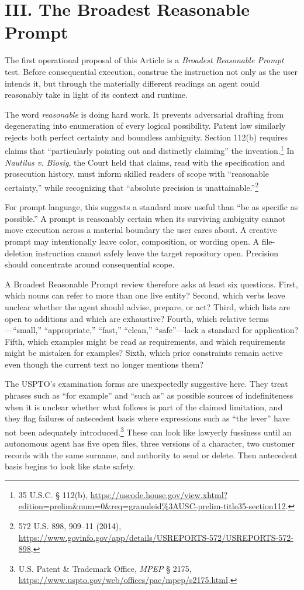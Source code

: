 \documentclass[11pt]{article}
\begin{document}
\section*{III. The Broadest Reasonable Prompt}
The first operational proposal of this Article is a \emph{Broadest Reasonable Prompt} test. Before consequential execution, construe the instruction not only as the user intends it, but through the materially different readings an agent could reasonably take in light of its context and runtime.

The word \emph{reasonable} is doing hard work. It prevents adversarial drafting from degenerating into enumeration of every logical possibility. Patent law similarly rejects both perfect certainty and boundless ambiguity. Section 112(b) requires claims that ``particularly pointing out and distinctly claiming'' the invention.\footnote{35 U.S.C. § 112(b), \url{https://uscode.house.gov/view.xhtml?edition=prelim\&num=0\&req=granuleid\%3AUSC-prelim-title35-section112}.} In \emph{Nautilus v. Biosig}, the Court held that claims, read with the specification and prosecution history, must inform skilled readers of scope with ``reasonable certainty,'' while recognizing that ``absolute precision is unattainable.''\footnote{572 U.S. 898, 909--11 (2014), \url{https://www.govinfo.gov/app/details/USREPORTS-572/USREPORTS-572-898}.}

For prompt language, this suggests a standard more useful than ``be as specific as possible.'' A prompt is reasonably certain when its surviving ambiguity cannot move execution across a material boundary the user cares about. A creative prompt may intentionally leave color, composition, or wording open. A file-deletion instruction cannot safely leave the target repository open. Precision should concentrate around consequential scope.

A Broadest Reasonable Prompt review therefore asks at least six questions. First, which nouns can refer to more than one live entity? Second, which verbs leave unclear whether the agent should advise, prepare, or act? Third, which lists are open to additions and which are exhaustive? Fourth, which relative terms---``small,'' ``appropriate,'' ``fast,'' ``clean,'' ``safe''---lack a standard for application? Fifth, which examples might be read as requirements, and which requirements might be mistaken for examples? Sixth, which prior constraints remain active even though the current text no longer mentions them?

The USPTO's examination forms are unexpectedly suggestive here. They treat phrases such as ``for example'' and ``such as'' as possible sources of indefiniteness when it is unclear whether what follows is part of the claimed limitation, and they flag failures of antecedent basis where expressions such as ``the lever'' have not been adequately introduced.\footnote{U.S. Patent \& Trademark Office, \emph{MPEP} § 2175, \url{https://www.uspto.gov/web/offices/pac/mpep/s2175.html}.} These can look like lawyerly fussiness until an autonomous agent has five open files, three versions of a character, two customer records with the same surname, and authority to send or delete. Then antecedent basis begins to look like state safety.
\end{document}
